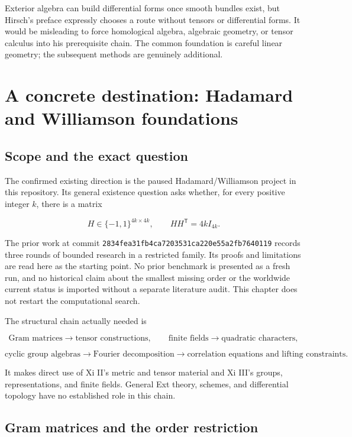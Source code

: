 \documentclass[
  11pt,
]{article}
\begin{document}
Exterior algebra can build differential forms once smooth bundles exist,
but Hirsch's preface expressly chooses a route without tensors or
differential forms. It would be misleading to force homological algebra,
algebraic geometry, or tensor calculus into his prerequisite chain. The
common foundation is careful linear geometry; the subsequent methods are
genuinely additional.

\section{A concrete destination: Hadamard and Williamson
foundations}\label{a-concrete-destination-hadamard-and-williamson-foundations}

\subsection{Scope and the exact
question}\label{scope-and-the-exact-question}

The confirmed existing direction is the paused Hadamard/Williamson
project in this repository. Its general existence question asks whether,
for every positive integer \(k\), there is a matrix

\[H\in\{-1,1\}^{4k\times4k},\qquad HH^{\mathsf T}=4kI_{4k}.\]

The prior work at commit
\texttt{2834fea31fb4ca7203531ca220e55a2fb7640119} records three rounds
of bounded research in a restricted family. Its proofs and limitations
are read here as the starting point. No prior benchmark is presented as
a fresh run, and no historical claim about the smallest missing order or
the worldwide current status is imported without a separate literature
audit. This chapter does not restart the computational search.

The structural chain actually needed is

\[\text{Gram matrices}\longrightarrow\text{tensor constructions},
\qquad
\text{finite fields}\longrightarrow\text{quadratic characters},
\]

\[\text{cyclic group algebras}\longrightarrow\text{Fourier decomposition}
\longrightarrow\text{correlation equations and lifting constraints}.
\]

It makes direct use of Xi II's metric and tensor material and Xi III's
groups, representations, and finite fields. General Ext theory, schemes,
and differential topology have no established role in this chain.

\subsection{Gram matrices and the order
restriction}\label{gram-matrices-and-the-order-restriction}
\end{document}
